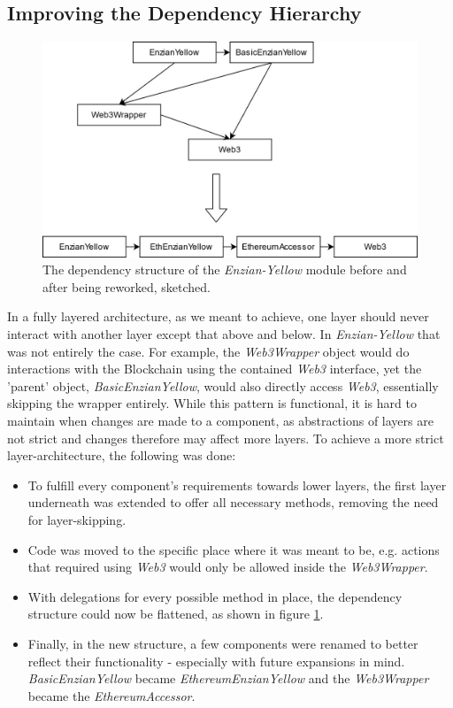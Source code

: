 \subsection{Improving the Dependency Hierarchy}
\label{sec:impr:enzian:dep}

\begin{figure}[h]
	\centering
	\captionsetup{justification=centering,margin=2cm}
	\includegraphics[height=0.5\textwidth]{gfx/enzian-dependencies}
	\caption{The dependency structure of the \emph{Enzian-Yellow} module before and after being reworked, sketched.}
	\label{fig:impr:enzian:dependencies}
\end{figure}

In a fully layered architecture, as we meant to achieve, one layer should never interact with another layer except that above and below. In \emph{Enzian-Yellow} that was not entirely the case. For example, the \emph{Web3Wrapper} object would do interactions with the Blockchain using the contained \emph{Web3} interface, yet the 'parent' object, \emph{BasicEnzianYellow}, would also directly access \emph{Web3}, essentially skipping the wrapper entirely. While this pattern is functional, it is hard to maintain when changes are made to a component, as abstractions of layers are not strict and changes therefore may affect more layers. To achieve a more strict layer-architecture, the following was done:
\begin{itemize}
    \item To fulfill every component's requirements towards lower layers, the first layer underneath was extended to offer all necessary methods, removing the need for layer-skipping.
    \item Code was moved to the specific place where it was meant to be, e.g. actions that required using \emph{Web3} would only be allowed inside the \emph{Web3Wrapper}.
    \item With delegations for every possible method in place, the dependency structure could now be flattened, as shown in figure \ref{fig:impr:enzian:dependencies}.
    \item Finally, in the new structure, a few components were renamed to better reflect their functionality - especially with future expansions in mind. \emph{BasicEnzianYellow} became \emph{EthereumEnzianYellow} and the \emph{Web3Wrapper} became the \emph{EthereumAccessor}.
\end{itemize}


